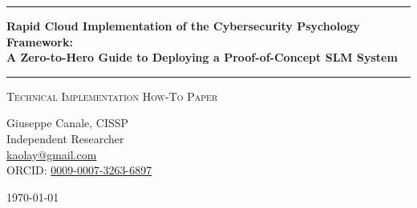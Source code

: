\documentclass[11pt,a4paper]{article}
\begin{document}
\thispagestyle{empty}
\begin{center}

\vspace*{0.5cm}

\rule{\textwidth}{1.5pt}

\vspace{0.5cm}

{\LARGE \textbf{Rapid Cloud Implementation of the Cybersecurity Psychology Framework:}}\\[0.3cm]
{\LARGE \textbf{A Zero-to-Hero Guide to Deploying a Proof-of-Concept SLM System}}

\vspace{0.5cm}

\rule{\textwidth}{1.5pt}

\vspace{0.3cm}

{\large \textsc{Technical Implementation How-To Paper}}

\vspace{0.5cm}

{\Large Giuseppe Canale, CISSP}\\[0.2cm]
Independent Researcher\\[0.1cm]
\href{mailto:kaolay@gmail.com}{kaolay@gmail.com}\\[0.1cm]
ORCID: \href{https://orcid.org/0009-0007-3263-6897}{0009-0007-3263-6897}

\vspace{0.8cm}

{\large \today}

\vspace{1cm}

\end{center}
\end{document}
